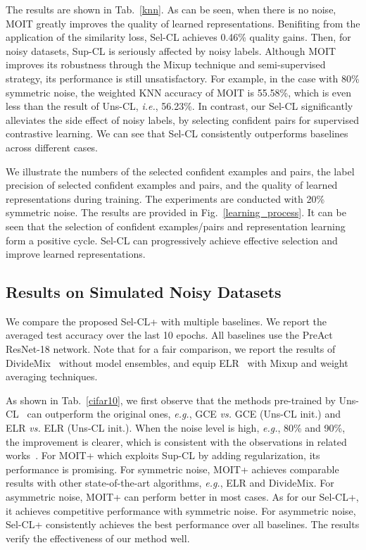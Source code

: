 \documentclass[10pt,twocolumn,letterpaper]{article}
\begin{document}
The results are shown in Tab.~\ref{knn}. As can be seen, when there is no noise, MOIT greatly improves the quality of learned representations. Benifiting from the application of the similarity loss, Sel-CL achieves 0.46\% quality gains. Then, for noisy datasets, Sup-CL is seriously affected by noisy labels. Although MOIT improves its robustness through the Mixup technique and semi-supervised strategy, its performance is still unsatisfactory. For example, in the case with 80\% symmetric noise, the weighted KNN accuracy of MOIT is 55.58\%, which is even less than the result of Uns-CL, \textit{i.e.}, 56.23\%. In contrast, our Sel-CL significantly alleviates the side effect of noisy labels, by selecting confident pairs for supervised contrastive learning. We can see that Sel-CL consistently outperforms baselines across different cases. 

We illustrate the numbers of the selected confident examples and pairs, the label precision of selected confident examples and pairs, and the quality of learned representations during training. The experiments are conducted with 20\% symmetric noise. The results are provided in Fig.~\ref{learning_process}. It can be seen that the selection of confident examples/pairs and representation learning form a positive cycle. Sel-CL can progressively achieve effective selection and improve learned representations. 


\subsection{Results on Simulated Noisy Datasets}\label{sec:4.3}

We compare the proposed Sel-CL+ with multiple baselines. We report the averaged test accuracy over the last 10 epochs. All baselines use the PreAct ResNet-18 network. Note that for a fair comparison, we report the results of DivideMix~\cite{LiSH20} without model ensembles, and equip ELR~\cite{LiuNRF20} with Mixup and weight averaging techniques. 

As shown in Tab.~\ref{cifar10}, we first observe that the methods pre-trained by Uns-CL~\cite{chen2020simple} can outperform the original ones, \textit{e.g.}, GCE \textit{vs.} GCE (Uns-CL init.) and ELR \textit{vs.} ELR (Uns-CL init.). When the noise level is high, \textit{e.g.}, 80\% and 90\%, the improvement is clearer, which is consistent with the observations in related
works~\cite{Ghosh2021,Zheltonozhskii2021}. For MOIT+ which exploits Sup-CL by adding regularization, its performance is promising. For symmetric noise, MOIT+ achieves comparable results with other state-of-the-art algorithms, \textit{e.g.}, ELR and DivideMix. For asymmetric noise, MOIT+ can perform better in most cases. As for our Sel-CL+, it achieves competitive performance with symmetric noise. For asymmetric noise, Sel-CL+ consistently achieves the best performance over all baselines. The results verify the effectiveness of our method well. 
\end{document}
